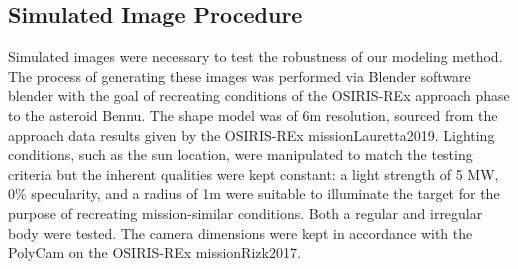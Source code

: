 \subsection{Simulated Image Procedure}
Simulated images were necessary to test the robustness of our modeling method. The process of generating these images was performed via Blender software {blender} with the goal of recreating conditions of the OSIRIS-REx approach phase to the asteroid Bennu. The shape model was of 6m resolution, sourced from the approach data results given by the OSIRIS-REx mission{Lauretta2019}. Lighting conditions, such as the sun location, were manipulated to match the testing criteria but the inherent qualities were kept constant: a light strength of 5 MW, $0\%$ specularity, and a radius of 1m were suitable to illuminate the target for the purpose of recreating mission-similar conditions. Both a regular and irregular body were tested. The camera dimensions were kept in accordance with the PolyCam on the OSIRIS-REx mission{Rizk2017}.



